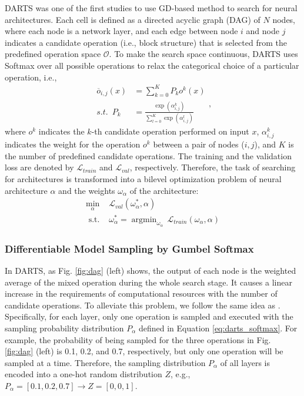 \documentclass[letterpaper]{article}
\begin{document}
DARTS \cite{darts} was one of the first studies to use GD-based method to search for neural architectures. Each cell is defined as a directed acyclic graph (DAG) of $N$ nodes, where each node is a network layer, and each edge between node $i$ and node $j$ indicates a candidate operation (i.e., block structure) that is selected from the predefined operation space $\mathcal{O}$. To make the search space continuous, DARTS \cite{darts} uses Softmax over all possible operations to relax the categorical choice of a particular operation, i.e.,
\begin{equation}
\begin{array}{cl}
\overline{o}_{i,j}(x)&=\sum_{k=0}^{K} P_{k} o^k(x)\\
s.t. \,\,\, P_{k} &= \frac{\exp \left(\alpha^{k}_{i,j}\right)}{\sum_{l=0}^{K} \exp \left(\alpha^{l}_{i,j}\right)}
\end{array},
\label{eq:darts_softmax}
\end{equation}
where $o^k$ indicates the $k$-th candidate operation performed on input $x$, $\alpha^k_{i,j}$ indicates the weight for the operation $o^k$ between a pair of nodes ($i,j$), and $K$ is the number of predefined candidate operations. The training and the validation loss are denoted by $\mathcal{L}_{train}$ and $\mathcal{L}_{val}$, respectively. Therefore, the task of searching for architectures is transformed into a bilevel optimization problem of neural architecture $\alpha$ and the weights $\omega_\alpha$ of the architecture:
\begin{equation}
\begin{array}{cl}
{\min_{\alpha}} & {\mathcal{L}_{val}\left(\omega_\alpha^*, \alpha\right)} \\
{\text { s.t. }} & {\omega_\alpha^*=\operatorname{argmin}_{\omega_\alpha} \, \mathcal{L}_{train}(\omega_\alpha, \alpha)}
\end{array}
\label{eq:bilevel}
\end{equation}


\subsubsection{Differentiable Model Sampling by Gumbel Softmax}

In DARTS, as Fig. \ref{fig:dag} (left) shows, the output of each node is the weighted average of the mixed operation during the whole search stage. It causes a linear increase in the requirements of computational resources with the number of candidate operations. To alleviate this problem, we follow the same idea as \cite{gdas}. Specifically, for each layer, only one operation is sampled and executed with the sampling probability distribution $P_\alpha$ defined in Equation \ref{eq:darts_softmax}. For example, the probability of being sampled for the three operations in Fig. \ref{fig:dag} (left) is 0.1, 0.2, and 0.7, respectively, but only one operation will be sampled at a time. Therefore, the sampling distribution $P_\alpha$ of all layers is encoded into a one-hot random distribution $Z$, e.g., $P_\alpha=[0.1,0.2,0.7]\rightarrow Z=[0,0,1]$.
\end{document}
